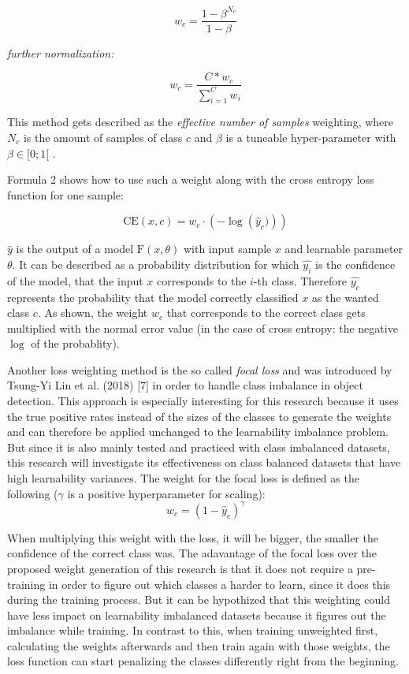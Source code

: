 \documentclass[journal]{IEEEtran}
\begin{document}
\[ w_c = \frac{1-\beta^{N_c}}{1-\beta} \]

\emph{further normalization:}

\[ w_c = \frac{C * w_c}{\sum_{i=1}^{C}w_i} \]

This method gets described as the \emph{effective number of samples} weighting, where $N_c$ is the amount of samples of class $c$ and $\beta$ is a tuneable hyper-parameter with $\beta \in [0;1[$ .

Formula 2 shows how to use such a weight along with the cross entropy loss function for one sample:

\[ \text{CE}(x, c) = w_{c} \cdot \left(-\log\left(\hat{y}_c)\right) \right) \]

$\hat{y}$ is the output of a model $\text{F}(x, \theta)$ with input sample $x$ and learnable parameter $\theta$. 
It can be described as a probability distribution for which $\hat{y_i}$ is the confidence of the model, that the input $x$ corresponds to the $i$-th class.
Therefore $\hat{y_c}$ represents the probability that the model correctly classified $x$ as the wanted class $c$. 
As shown, the weight $w_c$ that corresponds to the correct class gets multiplied with the normal error value (in the case of cross entropy: the negative $\log$ of the probablity).

Another loss weighting method is the so called \emph{focal loss} and was introduced by Tsung-Yi Lin et al. (2018) [7] in order to handle class imbalance in object detection.
This approach is especially interesting for this research because it uses the true positive rates instead of the sizes of the classes to generate the weights and can therefore be applied unchanged to the learnability imbalance problem.
But since it is also mainly tested and practiced with class imbalanced datasets, this research will investigate its effectiveness on class balanced datasets that have high learnability variances.
The weight for the focal loss is defined as the following ($\gamma$ is a positive hyperparameter for scaling):
\[ w_c = (1 - \hat{y}_c)^\gamma \]

When multiplying this weight with the loss, it will be bigger, the smaller the confidence of the correct class was. 
The adavantage of the focal loss over the proposed weight generation of this research is that it does not require a pre-training in order to figure out which classes a harder to learn, since it does this during the training process.
But it can be hypothized that this weighting could have less impact on learnability imbalanced datasets because it figures out the imbalance while training.
In contrast to this, when training unweighted first, calculating the weights afterwards and then train again with those weights, the loss function can start penalizing the classes differently right from the beginning.
\end{document}
